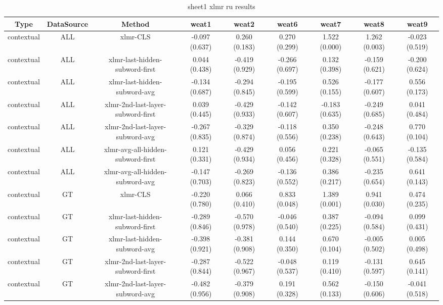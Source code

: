 \begin{sidewaystable}[htb]
    \centering
    \caption{sheet1 xlmr ru results}
    \label{appendix_tab:sheet1_xlmr_ru_results}
    \small
    \begin{tabular}{@{}ccccccccc@{}}
        \toprule
        Type & DataSource & Method & weat1 & weat2 & weat6 & weat7 & weat8 & weat9 \\
        \midrule
        contextual & ALL & xlmr-CLS & -0.097 (0.637) & 0.260 (0.183) & 0.270 (0.299) & 1.522 (0.000) & 1.262 (0.003) & -0.023 (0.519) \\
        contextual & ALL & xlmr-last-hidden-subword-first & 0.044 (0.438) & -0.419 (0.929) & -0.266 (0.697) & 0.132 (0.398) & -0.159 (0.621) & -0.200 (0.624) \\
        contextual & ALL & xlmr-last-hidden-subword-avg & -0.134 (0.687) & -0.294 (0.845) & -0.195 (0.599) & 0.526 (0.155) & -0.177 (0.607) & 0.556 (0.173) \\
        contextual & ALL & xlmr-2nd-last-layer-subword-first & 0.039 (0.445) & -0.429 (0.933) & -0.142 (0.607) & -0.183 (0.635) & -0.249 (0.685) & 0.041 (0.484) \\
        contextual & ALL & xlmr-2nd-last-layer-subword-avg & -0.267 (0.835) & -0.329 (0.874) & -0.118 (0.556) & 0.350 (0.238) & -0.248 (0.643) & 0.770 (0.104) \\
        contextual & ALL & xlmr-avg-all-hidden-subword-first & 0.121 (0.331) & -0.429 (0.934) & 0.056 (0.456) & 0.221 (0.328) & -0.065 (0.551) & -0.135 (0.584) \\
        contextual & ALL & xlmr-avg-all-hidden-subword-avg & -0.147 (0.703) & -0.269 (0.823) & -0.136 (0.552) & 0.386 (0.217) & -0.235 (0.654) & 0.641 (0.143) \\
        contextual & GT & xlmr-CLS & -0.220 (0.780) & 0.066 (0.410) & 0.833 (0.048) & 1.389 (0.001) & 0.941 (0.030) & 0.474 (0.235) \\
        contextual & GT & xlmr-last-hidden-subword-first & -0.289 (0.846) & -0.570 (0.978) & -0.046 (0.540) & 0.387 (0.225) & -0.094 (0.584) & 0.099 (0.431) \\
        contextual & GT & xlmr-last-hidden-subword-avg & -0.398 (0.921) & -0.381 (0.908) & 0.144 (0.350) & 0.670 (0.104) & -0.005 (0.502) & 0.005 (0.498) \\
        contextual & GT & xlmr-2nd-last-layer-subword-first & -0.287 (0.844) & -0.522 (0.967) & -0.048 (0.537) & 0.119 (0.410) & -0.131 (0.597) & 0.645 (0.141) \\
        contextual & GT & xlmr-2nd-last-layer-subword-avg & -0.482 (0.956) & -0.379 (0.908) & 0.191 (0.328) & 0.562 (0.133) & -0.150 (0.606) & -0.041 (0.518) \\

\end{tabular}
\end{sidewaystable}
